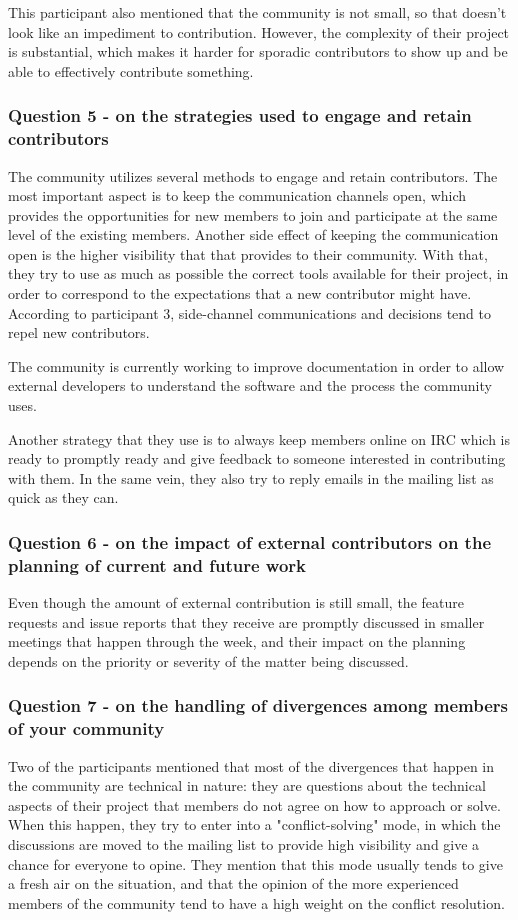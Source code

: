 \documentclass{sigchi}
\begin{document}
This participant also mentioned that the community is not small, so that doesn't look like an impediment to contribution. However, the complexity of their project is substantial, which makes it harder for sporadic contributors to show up and be able to effectively contribute something.

\subsubsection{Question 5 - on the strategies used to engage and retain contributors}

The community utilizes several methods to engage and retain contributors. The most important aspect is to keep the communication channels open, which provides the opportunities for new members to join and participate at the same level of the existing members. Another side effect of keeping the communication open is the higher visibility that that provides to their community. With that, they try to use as much as possible the correct tools available for their project, in order to correspond to the expectations that a new contributor might have. According to participant 3, side-channel communications and decisions tend to repel new contributors.

The community is currently working to improve documentation in order to allow external developers to understand the software and the process the community uses.

Another strategy that they use is to always keep members online on IRC which is ready to promptly ready and give feedback to someone interested in contributing with them. In the same vein, they also try to reply emails in the mailing list as quick as they can.

\subsubsection{Question 6 - on the impact of external contributors on the planning of current and future work}

Even though the amount of external contribution is still small, the feature requests and issue reports that they receive are promptly discussed in smaller meetings that happen through the week, and their impact on the planning depends on the priority or severity of the matter being discussed.

\subsubsection{Question 7 - on the handling of divergences among members of your community}
Two of the participants mentioned that most of the divergences that happen in the community are technical in nature: they are questions about the technical aspects of their project that members do not agree on how to approach or solve. When this happen, they try to enter into a "conflict-solving" mode, in which the discussions are moved to the mailing list to provide high visibility and give a chance for everyone to opine. They mention that this mode usually tends to give a fresh air on the situation, and that the opinion of the more experienced members of the community tend to have a high weight on the conflict resolution.
\end{document}

